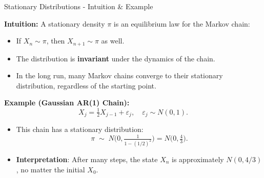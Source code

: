 \documentclass[8pt]{beamer}
\begin{document}
\begin{frame}{Stationary Distributions - Intuition \& Example}

\textbf{Intuition:}  
A stationary density $\pi$ is an \alert{equilibrium law} for the Markov chain:
\begin{itemize}
    \item If $X_n \sim \pi$, then $X_{n+1} \sim \pi$ as well.
    \item The distribution is \textbf{invariant} under the dynamics of the chain.
    \item In the long run, many Markov chains converge to their stationary distribution,
    regardless of the starting point.
\end{itemize}

\vspace{3mm}

\textbf{Example (Gaussian AR(1) Chain):}  
\[
X_j = \tfrac{1}{2} X_{j-1} + \varepsilon_j, 
\quad \varepsilon_j \sim N(0,1).
\]

\begin{itemize}
    \item This chain has a stationary distribution:
    \[
    \pi \;\sim\; N\!\Big(0, \tfrac{1}{1-(1/2)^2}\Big) 
    = N\!\Big(0,\tfrac{4}{3}\Big).
    \]
    \item \textbf{Interpretation}: After many steps, the state $X_n$ is approximately $N(0,4/3)$,
    no matter the initial $X_0$.
\end{itemize}

\end{frame}
\end{document}
